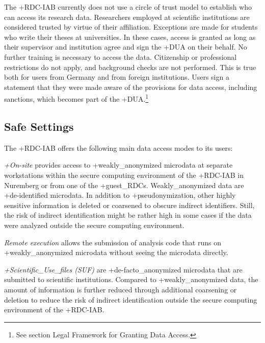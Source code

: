 \documentclass[
]{book}
\begin{document}
The +RDC-IAB\textbar{} currently does not use a circle of trust model to establish who can access its research data. Researchers employed at scientific institutions are considered trusted by virtue of their affiliation. Exceptions are made for students who write their theses at universities. In these cases, access is granted as long as their supervisor and institution agree and sign the +DUA\textbar{} on their behalf. No further training is necessary to access the data. Citizenship or professional restrictions do not apply, and background checks are not performed. This is true both for users from Germany and from foreign institutions. Users sign a statement that they were made aware of the provisions for data access, including sanctions, which becomes part of the +DUA\textbar.\footnote{See section Legal Framework for Granting Data Access.}

\hypertarget{safe-settings}{%
\subsection{Safe Settings}\label{safe-settings}}

The +RDC-IAB\textbar{} offers the following main data access modes to its users:

\emph{+On-site\textbar{}} provides access to +weakly\_anonymized\textbar{} microdata at separate workstations within the secure computing environment of the +RDC-IAB\textbar{} in Nuremberg or from one of the +guest\_RDC\textbar s. Weakly\_anonymized data are +de-identified\textbar{} microdata. In addition to +pseudonymization\textbar, other highly sensitive information is deleted or coarsened to obscure indirect identifiers. Still, the risk of indirect identification might be rather high in some cases if the data were analyzed outside the secure computing environment.

\emph{Remote execution} allows the submission of analysis code that runs on +weakly\_anonymized\textbar{} microdata without seeing the microdata directly.

\emph{+Scientific\_Use\_files\textbar{} (SUF)} are +de-facto\_anonymized\textbar{} microdata that are submitted to scientific institutions. Compared to +weakly\_anonymized\textbar{} data, the amount of information is further reduced through additional coarsening or deletion to reduce the risk of indirect identification outside the secure computing environment of the +RDC-IAB\textbar.
\end{document}
